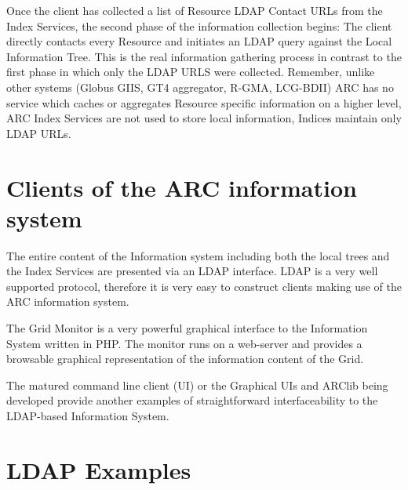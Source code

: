\documentclass{article}
\begin{document}
Once the client has collected a list of Resource LDAP Contact URLs 
from the Index Services,
the second phase of the information collection begins: 
The client directly contacts every Resource and initiates an LDAP query 
against the Local Information Tree.  
This is the real information gathering process in contrast to the first 
phase in which only the LDAP URLS were collected. Remember, 
unlike other systems (Globus GIIS, GT4 aggregator, R-GMA, LCG-BDII) 
ARC has no service  which caches or aggregates
Resource specific information on a higher level, 
ARC Index Services are not used to store local
information, Indices maintain only LDAP URLs.


\newpage
\appendix
\section{Clients of the ARC information system}


The entire content of the Information system including both the 
local trees and the Index Services are presented via an LDAP interface.
LDAP is a very well supported protocol, therefore it is very easy to 
construct clients making use of the ARC information system.

The Grid Monitor\cite{monitor} is a very powerful graphical interface 
to the Information System written in PHP. The monitor runs 
on a web-server and provides a browsable graphical representation of the 
information content of the Grid.

The matured command line client (UI)\cite{ui} or the 
Graphical UIs and  ARClib being developed  provide another examples
of straightforward interfaceability to the LDAP-based Information System.



\newpage

\section{LDAP Examples \label{appendix:examples}}
\end{document}
